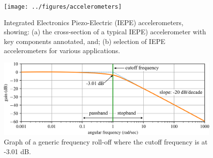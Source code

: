 \documentclass[12pt,letter]{article}
\begin{document}
\begin{figure}[H]
    \centering
    \texttt{[image: ../figures/accelerometers]}
    \caption{Integrated Electronics Piezo-Electric (IEPE) accelerometers, showing: (a) the cross-section of a typical IEPE) accelerometer with key components annotated, and; (b) selection of IEPE accelerometers for various applications.}
    \label{fig:accelerometers}
\end{figure} 

\begin{table}[H]
\caption{Specifications for various IEPE accelerometers.}
\label{table:accelerometers}
\end{table}




\begin{figure}[H]
	\centering
	\includegraphics[width=4.5in]{../figures/frequency_rolloff}
	\caption{Graph of a generic frequency roll-off where the cutoff frequency is at -3.01 dB\protect\footnotemark[1].}
	\label{fig:frequency_rolloff}
\end{figure}
\end{document}
